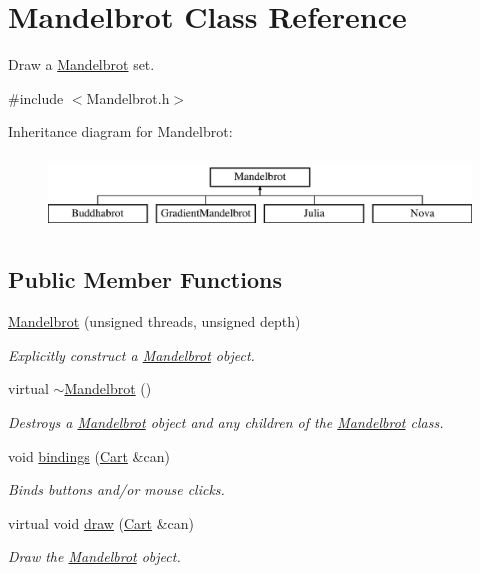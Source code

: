 \hypertarget{class_mandelbrot}{}\section{Mandelbrot Class Reference}
\label{class_mandelbrot}


Draw a \hyperlink{class_mandelbrot}{Mandelbrot} set.  




{\ttfamily \#include $<$Mandelbrot.\+h$>$}

Inheritance diagram for Mandelbrot\+:\begin{figure}[H]
\begin{center}
\leavevmode
\includegraphics[height=2.000000cm]{class_mandelbrot}
\end{center}
\end{figure}
\subsection*{Public Member Functions}
\begin{DoxyCompactItemize}
\item 
\hyperlink{class_mandelbrot_ae0c71b1d8894206cb896412ae2fa1529}{Mandelbrot} (unsigned threads, unsigned depth)
\begin{DoxyCompactList}\small\item\em Explicitly construct a \hyperlink{class_mandelbrot}{Mandelbrot} object. \end{DoxyCompactList}\item 
virtual \hyperlink{class_mandelbrot_a886df208f291f5d24d7f8f582962bb84}{$\sim$\+Mandelbrot} ()
\begin{DoxyCompactList}\small\item\em Destroys a \hyperlink{class_mandelbrot}{Mandelbrot} object and any children of the \hyperlink{class_mandelbrot}{Mandelbrot} class. \end{DoxyCompactList}\item 
void \hyperlink{class_mandelbrot_a4b50829db11e2642b616431ae4e2eacf}{bindings} (\hyperlink{classtsgl_1_1_cartesian_canvas}{Cart} \&can)
\begin{DoxyCompactList}\small\item\em Binds buttons and/or mouse clicks. \end{DoxyCompactList}\item 
virtual void \hyperlink{class_mandelbrot_ab7918e4de8f00f73290f110ca7a6cffd}{draw} (\hyperlink{classtsgl_1_1_cartesian_canvas}{Cart} \&can)
\begin{DoxyCompactList}\small\item\em Draw the \hyperlink{class_mandelbrot}{Mandelbrot} object. \end{DoxyCompactList}\end{DoxyCompactItemize}
